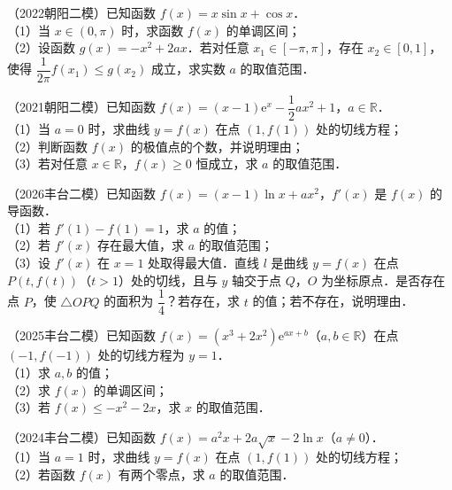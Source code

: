 \begin{example}
（2022朝阳二模）已知函数 $f(x)=x\sin x+\cos x$．\\
（1）当 $x\in(0,\pi)$ 时，求函数 $f(x)$ 的单调区间；\\
（2）设函数 $g(x)=-x^2+2ax$．若对任意 $x_1\in[-\pi,\pi]$，存在 $x_2\in[0,1]$，使得 $\dfrac1{2\pi}f(x_1)\leqslant g(x_2)$ 成立，求实数 $a$ 的取值范围．
\end{example}

\begin{example}
（2021朝阳二模）已知函数 $f(x)=(x-1)\mathrm{e}^x-\dfrac12ax^2+1$，$a\in\mathbb{R}$．\\
（1）当 $a=0$ 时，求曲线 $y=f(x)$ 在点 $(1,f(1))$ 处的切线方程；\\
（2）判断函数 $f(x)$ 的极值点的个数，并说明理由；\\
（3）若对任意 $x\in\mathbb{R}$，$f(x)\geqslant0$ 恒成立，求 $a$ 的取值范围．
\end{example}

\begin{example}
（2026丰台二模）已知函数 $f(x)=(x-1)\ln x+ax^2$，$f'(x)$ 是 $f(x)$ 的导函数．\\
（1）若 $f'(1)-f(1)=1$，求 $a$ 的值；\\
（2）若 $f'(x)$ 存在最大值，求 $a$ 的取值范围；\\
（3）设 $f'(x)$ 在 $x=1$ 处取得最大值．直线 $l$ 是曲线 $y=f(x)$ 在点 $P(t,f(t))$（$t>1$）处的切线，且与 $y$ 轴交于点 $Q$，$O$ 为坐标原点．是否存在点 $P$，使 $\triangle OPQ$ 的面积为 $\dfrac14$？若存在，求 $t$ 的值；若不存在，说明理由．
\end{example}

\begin{example}
（2025丰台二模）已知函数 $f(x)=(x^3+2x^2)\mathrm{e}^{ax+b}$（$a,b\in\mathbb{R}$）在点 $(-1,f(-1))$ 处的切线方程为 $y=1$．\\
（1）求 $a,b$ 的值；\\
（2）求 $f(x)$ 的单调区间；\\
（3）若 $f(x)\leqslant-x^2-2x$，求 $x$ 的取值范围．
\end{example}

\begin{example}
（2024丰台二模）已知函数 $f(x)=a^2x+2a\sqrt{x}-2\ln x$（$a\neq0$）．\\
（1）当 $a=1$ 时，求曲线 $y=f(x)$ 在点 $(1,f(1))$ 处的切线方程；\\
（2）若函数 $f(x)$ 有两个零点，求 $a$ 的取值范围．
\end{example}

